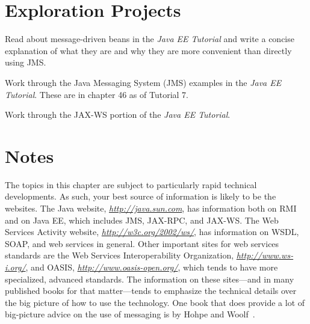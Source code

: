 \section*{Exploration Projects}
\begin{chapterEnumerate}
\item
Read about message-driven beans in the \textit{Java EE Tutorial} and write a
concise explanation of what they are and why they are more convenient
than directly using JMS.
\item
Work through the Java Messaging System (JMS) examples in the \textit{Java EE Tutorial}. These are in chapter 46 as of Tutorial 7.
\item
Work through the JAX-WS portion of the \textit{Java EE Tutorial}.  
\end{chapterEnumerate}


\section*{Notes}
The topics in this chapter are subject to particularly rapid technical
developments.  As such, your best source of information is likely to
be the websites.  The Java website, \textit{\url{http://java.sun.com}}, has
information both on RMI and on Java EE, which includes JMS, JAX-RPC, and JAX-WS.
The Web Services Activity website, \textit{\url{http://w3c.org/2002/ws/}}, has
information on WSDL, SOAP, and web services in general.  Other
important sites for web services standards are the Web Services
Interoperability Organization, \textit{\url{http://www.ws-i.org/}}, and OASIS,
\textit{\url{http://www.oasis-open.org/}}, which tends to have more specialized,
advanced standards.  The information on these sites---and in many
published books for that matter---tends to emphasize the technical
details over the big picture of how to use the technology.  One book
that does provide a lot of big-picture advice on the use of messaging
is by Hohpe and Woolf~\cite{max1157}.

